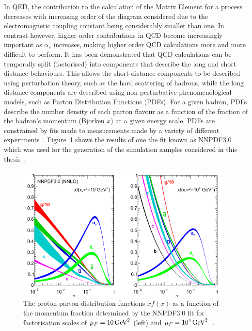 In QED, the contribution to the calculation of the Matrix Element for a process decreases with increasing order of the diagram considered due to the electromagnetic coupling constant being considerably smaller than one.
In contrast however, higher order contributions in QCD become increasingly important as $\alpha_{s}$ increases, making higher order QCD calculations more and more difficult to perform.
It has been demonstrated that QCD calculations can be temporally split (factorised) into components that describe the long and short distance behaviours.
This allows the short distance components to be described using perturbation theory, such as the hard scattering of hadrons, while the long distance components are described using non-perturbative phenomenological models, such as Parton Distribution Functions (PDFs).
For a given hadron, PDFs describe the number density of each parton flavour as a function of the fraction of the hadron's momentum (Bjorken $x$) at a given energy scale.
PDFs are constrained by fits made to measurements made by a variety of different experiments~\cite{Ball:2014uwa,devenish2004deep}.
Figure~\ref{fig:pdf} shows the results of one the fit known as NNPDF3.0 which was used for the generation of the simulation samples considered in this thesis~\cite{Ball:2014uwa}.

\begin{figure}[htb]
\begin{center}
\includegraphics[width=0.97\textwidth]{figs/sm/pdf.png}
\caption{The proton parton distribution functions $xf(x)$ as a function of the momentum fraction determined by the NNPDF3.0 fit for factorisation scales of $\mu_{F} = 10\,\text{Ge\hspace{-.08em}V}^{2}$ (left) and $\mu_{F} = 10^{4}\,\text{Ge\hspace{-.08em}V}^{2}$~\cite{Ball:2014uwa}.
}
\label{fig:pdf}
\end{center}
\end{figure}

